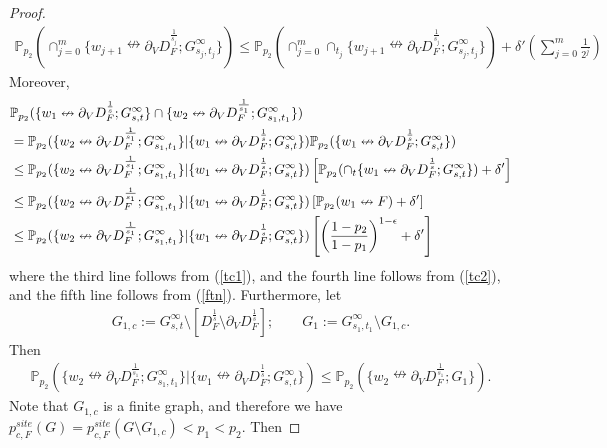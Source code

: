 \documentclass[11pt]{amsart}
\theoremstyle{plain}
\numberwithin{equation}{section}
\numberwithin{figure}{section}
\newcommand\PP{{\mathbb P}}
\begin{document}
\begin{proof}
\begin{align}
\PP_{p_2}(\cap_{j=0}^{m}\{w_{j+1}\nleftrightarrow \partial_V D_F^{\frac{1}{s_j}};G_{s_j,t_j}^{\infty}\})\leq 
\PP_{p_2}(\cap_{j=0}^{m}\cap_{t_j}\{w_{j+1}\nleftrightarrow \partial_V D_F^{\frac{1}{s_j}};G_{s_j,t_j}^{\infty}\})+\delta'\left(\sum_{j=0}^m\frac{1}{2^j}\right)\label{tc1}
\end{align}
Moreover,
\begin{align}
\label{s20}
&\PP_{p_2}(\{w_1\nleftrightarrow \partial_V D_F^{\frac{1}{s}};G_{s,t}^{\infty}\}\cap \{w_2\nleftrightarrow \partial_V D_F^{\frac{1}{s_1}};G_{s_1,t_1}^{\infty}\})\\
&=\PP_{p_2}(\{w_2\nleftrightarrow \partial_V D_F^{\frac{1}{s_1}};G_{s_1,t_1}^{\infty}\}|\{w_1\nleftrightarrow \partial_V D_F^{\frac{1}{s}};G_{s,t}^{\infty}\})\PP_{p_2}(\{w_1\nleftrightarrow \partial_V D_F^{\frac{1}{s}};G_{s,t}^{\infty}\})\notag\\
&\leq \PP_{p_2}(\{w_2\nleftrightarrow \partial_V D_F^{\frac{1}{s_1}};G_{s_1,t_1}^{\infty}\}|\{w_1\nleftrightarrow \partial_V D_F^{\frac{1}{s}};G_{s,t}^{\infty}\})
\left[\PP_{p_2}(\cap_t\{w_1\nleftrightarrow \partial_V D_F^{\frac{1}{s}};G_{s,t}^{\infty}\})+\delta'\right]\notag\\
&\leq \PP_{p_2}(\{w_2\nleftrightarrow \partial_V D_F^{\frac{1}{s_1}};G_{s_1,t_1}^{\infty}\}|\{w_1\nleftrightarrow \partial_V D_F^{\frac{1}{s}};G_{s,t}^{\infty}\})
\left[\PP_{p_2}(w_1\nleftrightarrow F)+\delta'\right]\notag\\
&\leq \PP_{p_2}(\{w_2\nleftrightarrow \partial_V D_F^{\frac{1}{s_1}};G_{s_1,t_1}^{\infty}\}|\{w_1\nleftrightarrow \partial_V D_F^{\frac{1}{s}};G_{s,t}^{\infty}\})
\left[\left(\frac{1-p_2}{1-p_1}\right)^{1-\epsilon}+\delta'\right]\notag
\end{align}
where the third line follows from (\ref{tc1}), and the fourth line follows from (\ref{tc2}), and the fifth line follows from (\ref{ftn}).
Furthermore, let
\begin{align*}
G_{1,c}:=G_{s,t}^{\infty}\setminus [D_F^{\frac{1}{s}}\setminus \partial_V D_F^{\frac{1}{s}}];\qquad
G_1:=G_{s_1,t_1}^{\infty}\setminus G_{1,c}.
\end{align*}
Then
\begin{align}
\PP_{p_2}(\{w_2\nleftrightarrow \partial_V D_F^{\frac{1}{s_1}};G_{s_1,t_1}^{\infty}\}|\{w_1\nleftrightarrow \partial_V D_F^{\frac{1}{s}};G_{s,t}^{\infty}\})\leq \PP_{p_2}(\{w_2\nleftrightarrow \partial_V D_F^{\frac{1}{s_1}};G_1\}).\label{s21}
\end{align}
Note that $G_{1,c}$ is a finite graph, and therefore we have $p_{c,F}^{site}(G)=p_{c,F}^{site}(G\setminus G_{1,c})<p_1<p_2$. Then

\end{proof}
\end{document}

